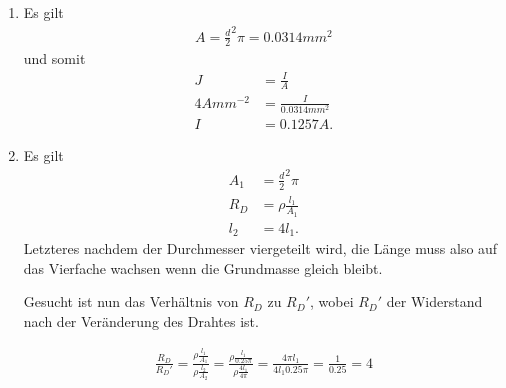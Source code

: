 \documentclass{article}
\begin{document}
\begin{enumerate}
    \item Es gilt
    \begin{align*}
        A = \frac{d}{2}^2 \pi = 0.0314mm^2
    \end{align*}
    und somit
    \begin{align*}
        J &= \frac{I}{A} \\
        4 Amm^{-2} &= \frac{I}{0.0314mm^2} \\
        I &= 0.1257 A.
    \end{align*}

    \item Es gilt
    \begin{align*}
        A_1 &= \frac{d}{2}^2 \pi \\
        R_D &= \rho\frac{l_1}{A_1} \\
        l_2 &= 4l_1.
    \end{align*}
    Letzteres nachdem der Durchmesser viergeteilt wird, die Länge muss also auf das Vierfache wachsen wenn die Grundmasse gleich bleibt.

    Gesucht ist nun das Verhältnis von $R_D$ zu $R_D'$, wobei $R_D'$ der Widerstand nach der Veränderung des Drahtes ist.

    \begin{align*}
        \frac{R_D}{R_D'} =
        \frac{\rho \frac{l_1}{A_1}}{\rho \frac{l_2}{A_2}} = 
        \frac{\rho \frac{l_1}{0.25\pi}}{\rho \frac{4l_1}{4\pi}} =
        \frac{4 \pi l_1}{4 l_1 0.25 \pi} = \frac{1}{0.25} = 4
    \end{align*}
\end{enumerate}
\end{document}
